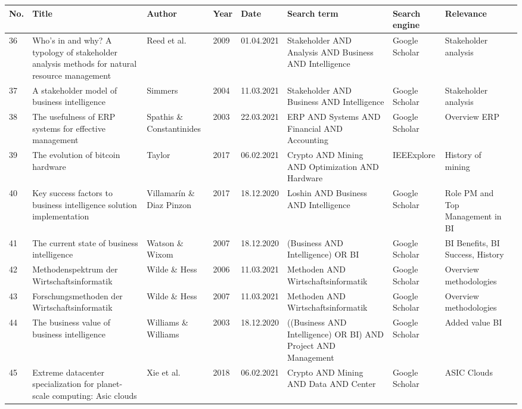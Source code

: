 \begin{table}[H]
	\scriptsize
  	\begin{tabularx}{\textwidth}[ht]{|l|X|X|l|l|X|l|X|X|}
		\hline
		\textbf{No.} & \textbf{Title} & \textbf{Author} & \textbf{Year} & \textbf{Date} & \textbf{Search term} & \textbf{Search engine} & \textbf{Relevance} \\
		\hline\hline
		36 & Who's in and why? A typology of stakeholder analysis methods for natural resource management & Reed et al. & 2009 & 01.04.2021 & Stakeholder AND Analysis AND Business AND Intelligence & Google Scholar & Stakeholder analysis \\
		\hline
		37 & A stakeholder model of business intelligence & Simmers & 2004 & 11.03.2021 & Stakeholder AND Business AND Intelligence & Google Scholar & Stakeholder analysis \\
		\hline
		38 & The usefulness of ERP systems for effective management & Spathis \& Constantinides & 2003 & 22.03.2021 & ERP AND Systems AND Financial AND Accounting & Google Scholar & Overview ERP \\
		\hline
		39 & The evolution of bitcoin hardware & Taylor & 2017 & 06.02.2021 & Crypto AND Mining AND Optimization AND Hardware & IEEExplore & History of mining \\
		\hline
		40 & Key success factors to business intelligence solution implementation & Villamar\'{i}n \& Diaz Pinzon & 2017 & 18.12.2020 & Loshin AND Business AND Intelligence & Google Scholar & Role PM and Top Management in BI \\
		\hline
		41 & The current state of business intelligence & Watson \& Wixom & 2007 & 18.12.2020 & (Business AND Intelligence) OR BI & Google Scholar & BI Benefits, BI Success, History \\
		\hline
		42 & Methodenspektrum der Wirtschaftsinformatik & Wilde \& Hess & 2006 & 11.03.2021 & Methoden AND Wirtschaftsinformatik & Google Scholar & Overview methodologies \\
		\hline
		43 & Forschungsmethoden der Wirtschaftsinformatik & Wilde \& Hess & 2007 & 11.03.2021 & Methoden AND Wirtschaftsinformatik & Google Scholar & Overview methodologies \\
		\hline
		44 & The business value of business intelligence & Williams \& Williams & 2003 & 18.12.2020 & ((Business AND Intelligence) OR BI) AND Project AND Management & Google Scholar & Added value BI \\
		\hline
		45 & Extreme datacenter specialization for planet-scale computing: Asic clouds & Xie et al. & 2018 & 06.02.2021 & Crypto AND Mining AND Data AND Center & Google Scholar & ASIC Clouds \\

\end{tabularx}
\end{table}
